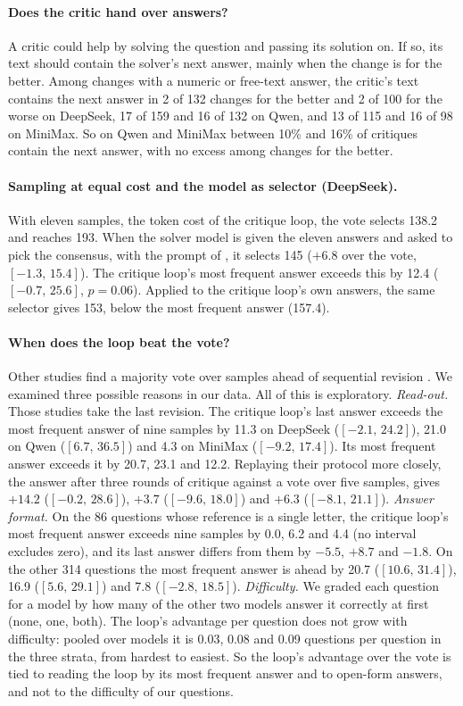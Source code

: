 \documentclass[11pt]{article}
\newcommand{\ds}{DeepSeek}
\newcommand{\qw}{Qwen}
\newcommand{\mm}{MiniMax}
\newcommand{\ci}[2]{$[#1,\,#2]$}
\begin{document}
\paragraph{Does the critic hand over answers?}
A critic could help by solving the question and passing its solution on.
If so, its text should contain the solver's next answer, mainly when the change is for the better.
Among changes with a numeric or free-text answer, the critic's text contains the next answer in 2 of 132 changes for the better and 2 of 100 for the worse on \ds, 17 of 159 and 16 of 132 on \qw, and 13 of 115 and 16 of 98 on \mm.
So on \qw{} and \mm{} between 10\% and 16\% of critiques contain the next answer, with no excess among changes for the better.

\paragraph{Sampling at equal cost and the model as selector (\ds).}
With eleven samples, the token cost of the critique loop, the vote selects 138.2 and reaches 193.
When the solver model is given the eleven answers and asked to pick the consensus, with the prompt of \citet{chen2023usc}, it selects 145 ($+6.8$ over the vote, \ci{-1.3}{15.4}).
The critique loop's most frequent answer exceeds this by 12.4 (\ci{-0.7}{25.6}, $p=0.06$).
Applied to the critique loop's own answers, the same selector gives 153, below the most frequent answer (157.4).

\paragraph{When does the loop beat the vote?}
Other studies find a majority vote over samples ahead of sequential revision \citep{wang2025rethinking,mirzaei2026sample}.
We examined three possible reasons in our data. All of this is exploratory.
\emph{Read-out.} Those studies take the last revision. The critique loop's last answer exceeds the most frequent answer of nine samples by 11.3 on \ds{} (\ci{-2.1}{24.2}), 21.0 on \qw{} (\ci{6.7}{36.5}) and 4.3 on \mm{} (\ci{-9.2}{17.4}). Its most frequent answer exceeds it by 20.7, 23.1 and 12.2.
Replaying their protocol more closely, the answer after three rounds of critique against a vote over five samples, gives $+14.2$ (\ci{-0.2}{28.6}), $+3.7$ (\ci{-9.6}{18.0}) and $+6.3$ (\ci{-8.1}{21.1}).
\emph{Answer format.} On the 86 questions whose reference is a single letter, the critique loop's most frequent answer exceeds nine samples by 0.0, 6.2 and 4.4 (no interval excludes zero), and its last answer differs from them by $-5.5$, $+8.7$ and $-1.8$. On the other 314 questions the most frequent answer is ahead by 20.7 (\ci{10.6}{31.4}), 16.9 (\ci{5.6}{29.1}) and 7.8 (\ci{-2.8}{18.5}).
\emph{Difficulty.} We graded each question for a model by how many of the other two models answer it correctly at first (none, one, both). The loop's advantage per question does not grow with difficulty: pooled over models it is 0.03, 0.08 and 0.09 questions per question in the three strata, from hardest to easiest.
So the loop's advantage over the vote is tied to reading the loop by its most frequent answer and to open-form answers, and not to the difficulty of our questions.
\end{document}
